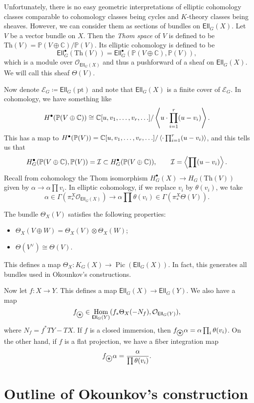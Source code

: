 \documentclass[leqno, openany]{memoir}
\theoremstyle{definition}
\theoremstyle{remark}
\theoremstyle{plain}
\theoremstyle{definition}
\theoremstyle{remark}
\newcommand{\C}{\mathbb{C}}
\renewcommand{\P}{\mathbb{P}}
\newcommand{\mc}[1]{\mathcal{#1}}
\newcommand{\mr}[1]{\mathrm{#1}}
\newcommand{\ms}[1]{\mathsf{#1}}
\newcommand{\ostar}{\stackMath\mathbin{\stackinset{c}{0ex}{c}{0ex}{\star}{\bigcirc}}}
\DeclareMathOperator{\Hom}{Hom}
\DeclareMathOperator{\Pic}{Pic}
\begin{document}
Unfortunately, there is no easy geometric interpretations of elliptic cohomology classes comparable to cohomology classes being cycles and $K$-theory classes being sheaves. However, we can consider them as sections of bundles on $\ms{Ell}_G(X)$. Let $V$ be a vector bundle on $X$. Then the \textit{Thom space} of $V$ is defined to be $\mr{Th}(V) = \P(V \oplus \C) / \P(V)$. Its elliptic cohomology is defined to be
\[ \ms{Ell}_G^{\bullet}(\mr{Th}(V)) = \ms{Ell}_G^{\bullet}(\P(V \oplus \C), \P(V)), \]
which is a module over $\mc{O}_{\ms{Ell}_G(X)}$ and thus a pushforward of a sheaf on $\ms{Ell}_G(X)$. We will call this sheaf $\Theta(V)$.

Now denote $\mc{E}_G \coloneqq \ms{Ell}_G(\mr{pt})$ and note that $\ms{Ell}_G(X)$ is a finite cover of $\mc{E}_G$. In cohomology, we have something like
\[ H^{\bullet}(\P(V \oplus \C)) \cong \C[u, v_1, \ldots, v_r, \ldots] / \ev{u \cdot \prod_{i=1}^r (u - v_i)}. \]
This has a map to $H^{\bullet}(\P(V)) = \C[u, v_1, \ldots, v_r, \ldots] / \ev{ \cdot \prod_{i=1}^r (u - v_i)}$, and this tells us that
\[ H^{\bullet}_G(\P(V \oplus \C), \P(V)) = \mc{I} \subset H_G^{\bullet}(\P(V \oplus \C)), \qquad \mc{I} = \ev{\prod (u-v_i)}. \]
Recall from cohomology the Thom isomorphism $H_G^{\bullet}(X) \to H_G(\mr{Th}(V))$ given by $\alpha \to \alpha \prod v_i$. In elliptic cohomology, if we replace $v_i$ by $\theta(v_i)$, we take
\[ \alpha \in \Gamma(\pi^X_* \mc{O}_{\ms{Ell}_G(X)}) \to \alpha \prod \theta(v_i) \in \Gamma (\pi_*^X \Theta(V)). \]

The bundle $\Theta_X(V)$ satisfies the following properties:
\begin{itemize}
    \item $\Theta_X(V \oplus W) = \Theta_X(V) \otimes \Theta_X(W)$;
    \item $\Theta(V^{\vee}) \cong \Theta(V)$.
\end{itemize}
This defines a map $\Theta_X \colon K_G(X) \to \Pic(\ms{Ell}_G(X))$. In fact, this generates all bundles used in Okounkov's constructions.

Now let $f \colon X \to Y$. This defines a map $\ms{Ell}_G(X) \to \ms{Ell}_G(Y)$. We also have a map
\[ f_{\ostar} \in \Hom_{\ms{Ell}_G(Y)}(f_* \Theta_X(-N_f), \mc{O}_{\ms{Ell}_G(Y)}), \]
where $N_f = f^* T Y - T X$. If $f$ is a closed immersion, then $f_{\ostar} \alpha = \alpha \prod_i \theta(v_i)$. On the other hand, if $f$ is a flat projection, we have a fiber integration map
\[ f_{\ostar} \alpha = \frac{\alpha}{\prod \theta(v_i)}. \]

\section{Outline of Okounkov's construction}
\end{document}
